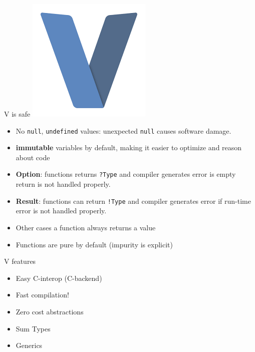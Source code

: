 \documentclass[
  ignorenonframetext,
]{beamer}
\providecommand{\tightlist}{%
  \setlength{\itemsep}{0pt}\setlength{\parskip}{0pt}}
\begin{document}
\begin{frame}[fragile]{V is safe}
\protect\hypertarget{v-is-safe}{}
\includegraphics[width=0.1\paperwidth]{img/vlang}

\begin{itemize}
\tightlist
\item
  No \texttt{null}, \texttt{undefined} values: unexpected \texttt{null}
  causes software damage.
\item
  \textbf{immutable} variables by default, making it easier to optimize
  and reason about code
\item
  \textbf{Option}: functions returns \texttt{?Type} and compiler
  generates error is empty return is not handled properly.
\item
  \textbf{Result}: functions can return \texttt{!Type} and compiler
  generates error if run-time error is not handled properly.
\item
  Other cases a function always returns a value
\item
  Functions are pure by default (impurity is explicit)
\end{itemize}
\end{frame}

\begin{frame}{V features}
\protect\hypertarget{v-features}{}
\begin{itemize}
\tightlist
\item
  Easy C-interop (C-backend)
\item
  Fast compilation!
\item
  Zero cost abstractions
\item
  Sum Types
\item
  Generics
\end{itemize}
\end{frame}
\end{document}
